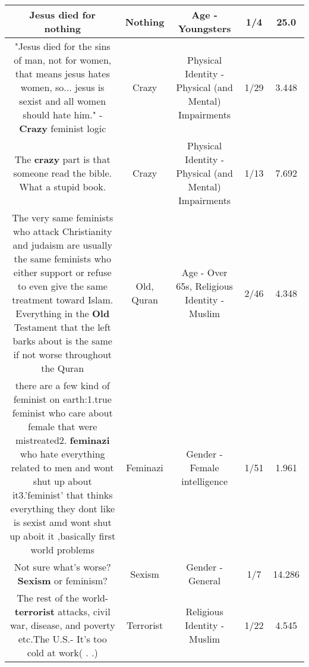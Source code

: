 \documentclass[11pt]{article}
\newlength\mylength
\begin{document}
\begin{center}
\begin{longtable}{|C{.65\mylength}|C{.30\mylength}|C{.12\mylength}|C{.12\mylength}|C{.12\mylength}|}
  \small Jesus died for nothing\normalsize   & Nothing & Age - Youngsters & 1/4 & 25.0 \\  \hline
  \small "Jesus died for the sins of man, not for women, that means jesus hates women, so... jesus is sexist and all women should hate him." - \textbf{Crazy} feminist logic\normalsize   & Crazy & Physical Identity - Physical (and Mental) Impairments & 1/29 & 3.448 \\  \hline
  \small The \textbf{crazy} part is that someone read the bible. What a stupid book.\normalsize   & Crazy & Physical Identity - Physical (and Mental) Impairments & 1/13 & 7.692 \\  \hline
  \small The very same feminists who attack Christianity and judaism are usually the same feminists who either support or refuse to even give the same treatment toward Islam. Everything in the \textbf{Old} Testament that the left barks about is the same if not worse throughout the Quran\normalsize   & Old, Quran & Age - Over 65s, Religious Identity - Muslim & 2/46 & 4.348 \\  \hline
  \small there are a few kind of feminist on earth:1.true feminist who care about female that were mistreated2. \textbf{feminazi} who hate everything related to men and wont shut up about it3.'feminist' that thinks everything they dont like is sexist amd wont shut up aboit it ,basically first world problems\normalsize   & Feminazi & Gender - Female intelligence & 1/51 & 1.961 \\  \hline
  \small Not sure what's worse?\textbf{Sexism} or feminism?\normalsize   & Sexism & Gender - General & 1/7 & 14.286 \\  \hline
  \small The rest of the world- \textbf{terrorist} attacks, civil war, disease, and  poverty etc.The U.S.- It's too cold at work( . .)\normalsize   & Terrorist & Religious Identity - Muslim & 1/22 & 4.545 \\  \hline

\end{longtable}
\end{center}
\end{document}
